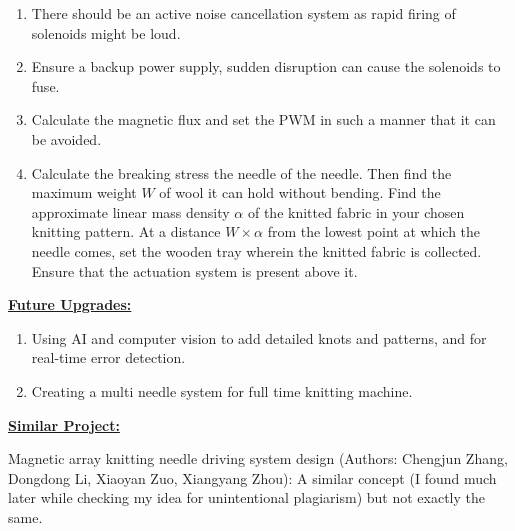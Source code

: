 \documentclass[10pt]{article}
\newcommand{\sectionlabel}[1]{\par\textbf{\underline{#1}}\par}
\begin{document}
\begin{enumerate}
  \item There should be an active noise cancellation system as rapid firing of solenoids might be loud.
  \item Ensure a backup power supply, sudden disruption can cause the solenoids to fuse.
  \item Calculate the magnetic flux and set the PWM in such a manner that it can be avoided.
  \item Calculate the breaking stress the needle of the needle. Then find the maximum weight $W$ of wool it can hold without bending. Find the approximate linear mass density $\alpha$ of the knitted fabric in your chosen knitting pattern. At a distance $W\times\alpha$ from the lowest point at which the needle comes, set the wooden tray wherein the knitted fabric is collected. Ensure that the actuation system is present above it.
\end{enumerate}

\sectionlabel{Future Upgrades:}

\begin{enumerate}
  \item Using AI and computer vision to add detailed knots and patterns, and for real-time error detection.
  \item Creating a multi needle system for full time knitting machine.
\end{enumerate}

\sectionlabel{Similar Project:}

Magnetic array knitting needle driving system design (Authors: Chengjun Zhang, Dongdong Li, Xiaoyan Zuo, Xiangyang Zhou): A similar concept (I found much later while checking my idea for unintentional plagiarism) but not exactly the same.
\end{document}
